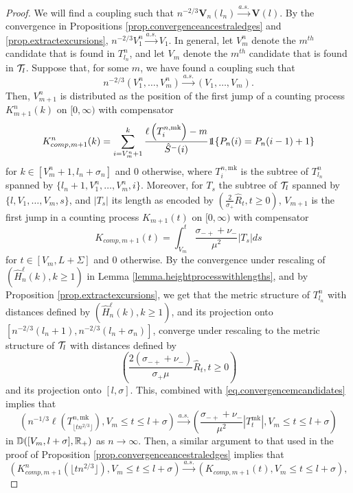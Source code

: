 \begin{proof}
We will find a coupling such that $n^{-2/3}\mathbf{V}_n(l_n)\overset{a.s.}{\to}\mathbf{V}(l).$ By the convergence in Propositions \ref{prop.convergenceancestraledges} and \ref{prop.extractexcursions}, $n^{-2/3}V_1^n\overset{a.s.}{\to}V_1$. In general, let $V_m^n$ denote the $m^{th}$ candidate that is found in $T^n_{l_n}$, and let $V_m$ denote the $m^{th}$ candidate that is found in ${\mathcal T}_l$. Suppose that, for some $m$, we have found a coupling such that 
\begin{equation}\label{eq.convergencemcandidates}n^{-2/3}(V_1^n,\dots,V_m^n)\overset{a.s.}{\to}(V_1,\dots,V_m).\end{equation}
Then, $V_{m+1}^n$ is distributed as the position of the first jump of a counting process $K^n_{m+1}(k)$ on $[0,\infty)$ with compensator 
$$K^n_{comp,m+1}(k)=\sum_{i=V_m^n+1}^k \frac{\ell\left(T^{n,\text{mk}}_{i}\right)-m}{\hat{S}^-(i)}  \one{\left\{P_n(i)=P_n(i-1)+1\right\}}$$
for $k\in [V_m^n+1,l_n+\sigma_n]$ and $0$ otherwise, where $T^{n,\text{mk}}_{i}$ is the subtree of $T^n_{l_n}$ spanned by $\{l_n+1,V^n_1,\dots,V^n_m,i\}$. 
Moreover, for $T_s$ the subtree of ${\mathcal T}_l$ spanned by $\{l,V_1,\dots,V_m, s\}$, and $|T_s|$ its length as encoded by $\left(\frac{2}{\sigma_+}\hat{R}_t,t\geq 0\right)$, $V_{m+1}$ is the first jump in a counting process $K_{m+1}(t)$ on $[0,\infty)$ with compensator 
$$K_{comp,m+1}(t)= \int_{V_m}^t\frac{\sigma_{-+}+\nu_-}{\mu^2}|T_s|ds$$
for $t\in [V_m,L+\Sigma]$ and $0$ otherwise. By the convergence under rescaling of $(\hat{H}^\ell_n(k),k\geq 1)$ in Lemma \ref{lemma.heightprocesswithlengths}, and by Proposition \ref{prop.extractexcursions}, we get that the metric structure of $T^n_{l_n}$ with distances defined by $(\hat{H}^\ell_n(k),k\geq 1)$, and its projection onto $[n^{-2/3}(l_n+1),n^{-2/3}(l_n+\sigma_n)]$, converge under rescaling to the metric structure of ${\mathcal T}_l$ with distances defined by $$\left(\frac{2(\sigma_{-+}+\nu_-)}{\sigma_+\mu}\hat{R}_t,t\geq 0\right)$$ and its projection onto $[l,\sigma]$. This, combined with \eqref{eq.convergencemcandidates} implies that 
$$\left(n^{-1/3}\ell\left(T^{n,\text{mk}}_{\lfloor t n^{2/3}\rfloor}\right),V_m\leq t \leq l+\sigma\right)\overset{a.s.}{\to} \left(\frac{\sigma_{-+}+\nu_-}{\mu^2}|T^{\text{mk}}_t|, V_m\leq t \leq l+\sigma\right)$$ in ${\mathbb D}([V_m,l+\sigma],{\mathbb R}_+)$ as $n\to \infty$. Then, a similar argument to that used in the proof of Proposition \ref{prop.convergenceancestraledges} implies that 
$$\left(K^n_{comp,m+1}\left(\lfloor t n^{2/3}\rfloor \right),V_m\leq t \leq l+\sigma\right)\overset{a.s.}{\to}\left(K_{comp,m+1}(t),V_m\leq t \leq l+\sigma\right),$$

\end{proof}
